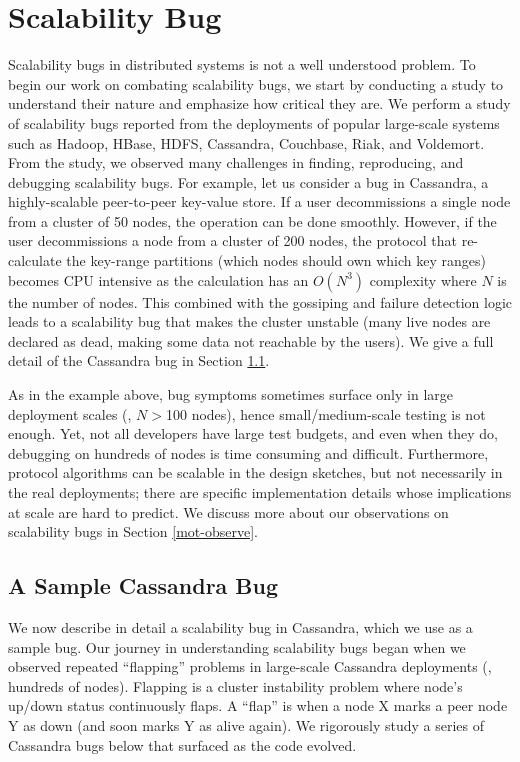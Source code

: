 \section{Scalability Bug}
\label{sec-sck-observe}

Scalability bugs in distributed systems is not a well understood problem.
To begin our work on combating scalability bugs, we start by conducting a study
to understand their nature and emphasize how critical they are.
%
We perform a study of \totAll scalability bugs reported from the deployments
of popular large-scale systems such as
Hadoop,
HBase,
HDFS,
Cassandra,
Couchbase,
Riak, and
Voldemort.
%
From the study, we observed many challenges in finding, reproducing, and
debugging scalability bugs. For example, let us consider a bug in Cassandra, a
highly-scalable peer-to-peer key-value store. If a user decommissions a single
node from a cluster of 50 nodes, the operation can be done smoothly. However, if
the user decommissions a node from a cluster of 200 nodes, the protocol that
re-calculate the key-range partitions (which nodes should own which key ranges)
becomes CPU intensive as the calculation has an $O(N^3)$ complexity where $N$ is
the number of nodes.  This combined with the gossiping and failure detection
logic leads to a scalability bug that makes the cluster unstable (many live
nodes are declared as dead, making some data not reachable by the users). We
give a full detail of the Cassandra bug in Section \ref{mot-bug}.

%
As in the example above, bug symptoms sometimes surface only in large deployment
scales (\eg, $N$$>$100 nodes), hence small/medium-scale testing is not enough.
Yet, not all developers have large test budgets, and even when they do,
debugging on hundreds of nodes is time consuming and difficult.
%
Furthermore, protocol algorithms can be scalable in the design sketches, but not
necessarily in the real deployments; there are specific implementation details
whose implications at scale are hard to predict. We discuss more about our
observations on scalability bugs in Section \ref{mot-observe}.

\subsection{A Sample Cassandra Bug}
\label{mot-bug}



We now describe in detail a scalability bug in Cassandra, which we use as a
sample bug.
%
Our journey in understanding scalability bugs began when we observed repeated
``flapping'' problems in large-scale Cassandra deployments (\ie, hundreds of
nodes).
%
Flapping is a cluster instability problem where node's up/down status
continuously flaps.  A ``flap'' is when a node X marks a peer node Y as down
(and soon marks Y as alive again).
%
We rigorously study a series of Cassandra bugs below that surfaced as the code
evolved.

